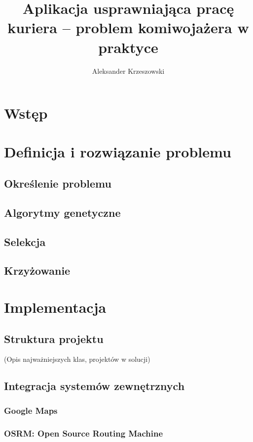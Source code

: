 \documentclass[12pt,a4paper]{report}
\begin{document}
	\author{Aleksander Krzeszowski}
	\title{Aplikacja usprawniająca pracę kuriera -- problem komiwojażera w praktyce}
	\maketitle
	
	\tableofcontents
	
	\chapter*{Wstęp}
		
	\chapter{Definicja i rozwiązanie problemu}
		\section{Określenie problemu}
			
		\section{Algorytmy genetyczne}
		\section{Selekcja}
		\section{Krzyżowanie}
			
	\chapter{Implementacja}
	\section{Struktura projektu}
	(Opis najważniejszych klas, projektów w solucji)
	\section{Integracja systemów zewnętrznych}
		\subsection{Google Maps}
		\subsection{OSRM: Open Source Routing Machine}
\end{document}
